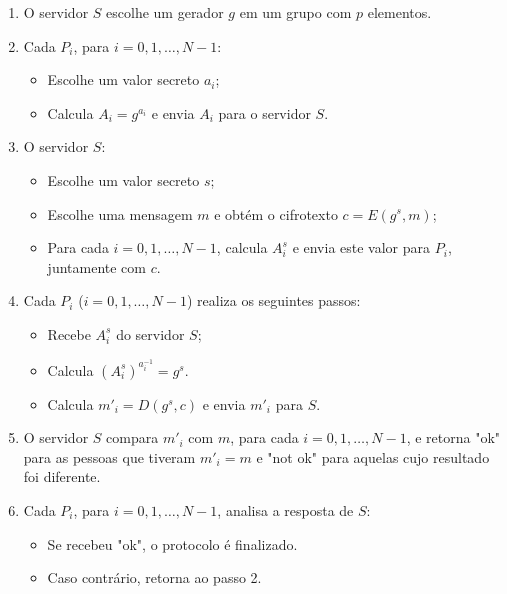 \documentclass[a4paper,12pt]{article}
\begin{document}
\begin{enumerate}
    \item O servidor $S$ escolhe um gerador \( g \) em um grupo com \( p \) elementos.

    \item Cada \( P_i \), para \( i = 0, 1, \dots, N-1 \):
    \begin{itemize}
        \item Escolhe um valor secreto \( a_i \);
        \item Calcula \( A_i = g^{a_i} \) e envia \( A_i \) para o servidor \( S \).
    \end{itemize}

    \item O servidor \( S \):
    \begin{itemize}
        \item Escolhe um valor secreto \( s \);
        \item Escolhe uma mensagem \( m \) e obtém o cifrotexto \( c = E(g^s, m) \);
        \item Para cada \( i = 0, 1, \dots, N-1 \), calcula \( A_i^{s} \) e envia este valor para \( P_i \), juntamente com \( c \).
    \end{itemize}

    \item Cada \( P_i \) (\( i = 0, 1, \dots, N-1 \)) realiza os seguintes passos:
    \begin{itemize}
        \item Recebe \( A_i^{s} \) do servidor \( S \);
        \item Calcula \( \left(A_i^{s}\right)^{a_i^{-1}} = g^{s} \). 
        \item Calcula \( m'_i = D(g^s, c) \) e envia \( m'_i \) para \( S \).
    \end{itemize}

    \item O servidor \( S \) compara \( m'_i \) com \( m \), para cada \( i = 0, 1, \dots, N-1 \), e retorna "ok" para as pessoas que tiveram \( m'_i = m \) e "not ok" para aquelas cujo resultado foi diferente. 

    \item Cada \( P_i \), para \( i = 0, 1, \dots, N-1 \), analisa a resposta de \( S \):
    \begin{itemize}
        \item Se recebeu "ok", o protocolo é finalizado.
        \item Caso contrário, retorna ao passo 2.
    \end{itemize}
\end{enumerate}
\end{document}
